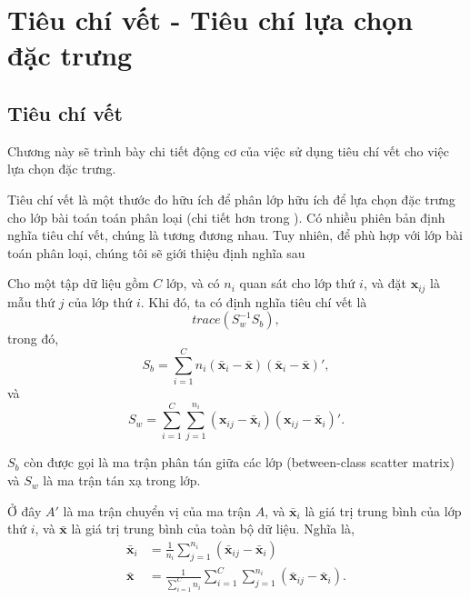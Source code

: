 \chapter{Tiêu chí vết - Tiêu chí lựa chọn đặc trưng}
\section{Tiêu chí vết}
Chương này sẽ trình bày chi tiết động cơ của việc sử dụng tiêu chí vết cho việc lựa chọn đặc trưng.

Tiêu chí vết là một thước đo hữu ích để phân lớp hữu ích để lựa chọn đặc trưng cho lớp bài toán toán phân loại (chi tiết hơn trong  \cite{fukunaga2013introduction,johnson2002applied}). Có nhiều phiên bản định nghĩa tiêu chí vết, chúng là tương đương nhau. Tuy nhiên, để phù hợp với lớp bài toán phân loại, chúng tôi sẽ giới thiệu định nghĩa sau
\begin{DN}
	Cho một tập dữ liệu gồm $C$ lớp, và có $n_i$ quan sát cho lớp thứ $i$, và đặt $\mathbf{x}_{ij}$ là mẫu thứ $j$ của lớp thứ $i$. Khi đó, ta có định nghĩa tiêu chí vết là
	\begin{equation}
		trace(S_w^{-1}S_b),
	\end{equation}
	trong đó, 
	\begin{equation}
		S_b = \sum_{i=1}^Cn_i(\bar{\boldsymbol{x} }_i-\bar{\boldsymbol{x} })(\bar{\boldsymbol{x} }_i-\bar{\boldsymbol{x} })',
	\end{equation}
	và 
	\begin{equation}
		S_w = \sum_{i=1}^C\sum_{j=1}^{n_i}( {\boldsymbol{x}  }_{ij}-\bar{\boldsymbol{x} }_i)({\boldsymbol{x} }_{ij}-\bar{\boldsymbol{x} }_i)'.
	\end{equation}
\end{DN}
$S_b$ còn được gọi là ma trận phân tán giữa các lớp (between-class scatter matrix) và $S_w$ là ma trận tán xạ trong lớp.

Ở đây $A'$ là ma trận chuyển vị của ma trận $A$, và $\bar{\boldsymbol{x}}_i$ là giá trị trung bình của lớp thứ $i$, và $\bar{\boldsymbol{x}}$ là giá trị trung bình của toàn bộ dữ liệu. Nghĩa là,
\begin{align*}
	\bar{\boldsymbol{x}}_i &= \frac{1}{n_i}\sum_{j=1}^{n_i}(\bar{\boldsymbol{x}}_{ij}-\bar{\boldsymbol{x}}_i)\\
	\bar{\boldsymbol{x}} &= \frac{1}{\sum_{i=1}^Cn_i}\sum_{i=1}^C\sum_{j=1}^{n_i}(\bar{\boldsymbol{x}}_{ij}-\bar{\boldsymbol{x}}_i).
\end{align*}

